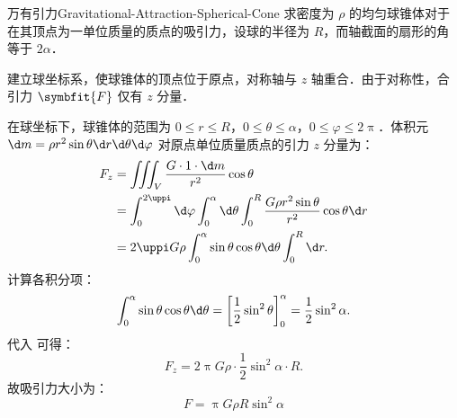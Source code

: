 \begin{problem}{万有引力}{Gravitational-Attraction-Spherical-Cone}
    求密度为 $\rho$ 的均匀球锥体对于在其顶点为一单位质量的质点的吸引力，设球的半径为 $R$，而轴截面的扇形的角等于 $2\alpha$．
\end{problem}

\begin{solution}
    建立球坐标系，使球锥体的顶点位于原点，对称轴与 $z$ 轴重合．由于对称性，合引力 $\symbfit{F}$ 仅有 $z$ 分量．

    在球坐标下，球锥体的范围为 $0 \le r \le R$，$0 \le \theta \le \alpha$，$0 \le \varphi \le 2\uppi$．体积元 $\d m = \rho r^2 \sin \theta \d r \d \theta \d \varphi$ 对原点单位质量质点的引力 $z$ 分量为：
    \begin{equation}
        \label{eq:gravity-integral}
        \begin{aligned}
            F_z & = \iiint_V \frac{G \cdot 1 \cdot \d m}{r^2} \cos \theta                                                             \\
                & = \int_0^{2\uppi} \d \varphi \int_0^{\alpha} \d \theta \int_0^R \frac{G \rho r^2 \sin \theta}{r^2} \cos \theta \d r \\
                & = 2\uppi G \rho \int_0^{\alpha} \sin \theta \cos \theta \d \theta \int_0^R \d r.
        \end{aligned}
    \end{equation}
    计算各积分项：
    \begin{equation}
        \int_0^{\alpha} \sin \theta \cos \theta \d \theta = \left[ \frac{1}{2} \sin^2 \theta \right]_0^{\alpha} = \frac{1}{2} \sin^2 \alpha.
    \end{equation}
    代入  可得：
    \begin{equation}
        F_z = 2\uppi G \rho \cdot \frac{1}{2} \sin^2 \alpha \cdot R.
    \end{equation}
    故吸引力大小为：
    \begin{equation}
        F = \boxed{ \uppi G \rho R \sin^2 \alpha }
    \end{equation}
\end{solution}

\endinput

